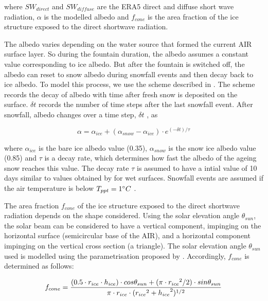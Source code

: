 \documentclass[utf8]{frontiersSCNS} %
\begin{document}
where $SW_{direct}$ and $SW_{diffuse}$ are the ERA5 direct and diffuse short wave radiation, $\alpha$ is the modelled
albedo and $f_{cone}$ is the area fraction of the ice structure exposed to the direct shortwave radiation.

The albedo varies depending on the water source that formed the current AIR surface layer. So during the fountain
duration, the albedo assumes a constant value corresponding to ice albedo. But after the fountain is switched off, the
albedo can reset to snow albedo during snowfall events and then decay back to ice albedo. To model this process, we use
the scheme described in \cite{OerlemansKnap_1998}. The scheme records the decay of albedo with time after fresh snow is
deposited on the surface. $\delta t$ records the number of time steps after the last snowfall event. After snowfall,
albedo changes over a time step, $\delta t$ , as

\begin{equation} \alpha=\alpha_{ice}+(\alpha_{snow}-\alpha_{ice}) \cdot e^{(-\delta t)/\tau} \label{eqn:a}
\end{equation}

where $\alpha_{ice}$ is the bare ice albedo value (0.35), $\alpha_{snow}$ is the snow ice albedo value (0.85) and $\tau$
is a decay rate, which determines how fast the albedo of the ageing snow reaches this value.  The decay rate $\tau$ is
assumed to have a intial value of 10 days similar to values obtained by \cite{Schmidt_2017} for wet surfaces. Snowfall
events are assumed if the air temperature is below $T_{ppt}=1 \degree C$ \citep{FujitaAgeta_2000}.

The area fraction $f_{cone}$ of the ice structure exposed to the direct shortwave radiation depends on the shape
considered. Using the solar elevation angle $\theta_{sun}$,  the solar beam can be considered to have a vertical
component, impinging on the horizontal surface (semicircular base of the AIR), and a horizontal component impinging on
the vertical cross section (a triangle). The solar elevation angle $\theta_{sun}$ used is modelled using the
parametrisation proposed by \cite{Woolf_1968}. Accordingly, $f_{cone}$ is determined as follows:

\begin{equation} \begin{split} f_{cone}& =\frac{(0.5 \cdot r_{ice} \cdot h_{ice}) \cdot cos \theta_{sun} +(\pi \cdot
			{r_{ice}}^2/2) \cdot sin \theta_{sun} }{\pi \cdot r_{ice} \cdot ({r_{ice}}^2+{h_{ice}}^2)^{1/2}}\\ \end{split}
	\label{eqn:f_{cone}} \end{equation}
\end{document}
